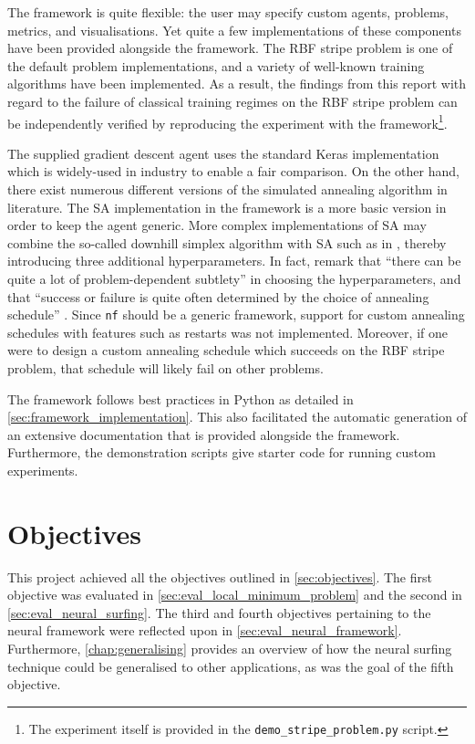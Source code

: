 The framework is quite flexible: the user may specify custom agents, problems, metrics, and visualisations. 
Yet quite a few implementations of these components have been provided alongside the framework.
The RBF stripe problem is one of the default problem implementations, and a variety of well-known training algorithms have been implemented.
As a result, the findings from this report with regard to the failure of classical training regimes on the RBF stripe problem can be independently verified by reproducing the experiment with the framework\footnote{The experiment itself is provided in the \texttt{demo\_stripe\_problem.py} script.}. 

The supplied gradient descent agent uses the standard Keras implementation which is widely-used in industry to enable a fair comparison.
On the other hand, there exist numerous different versions of the simulated annealing algorithm in literature.
The SA implementation in the framework is a more basic version in order to keep the agent generic.
More complex implementations of SA may combine the so-called downhill simplex algorithm \cite{nelder1965} with SA such as in \textcite[p. 444-455]{press1992}, thereby introducing three additional hyperparameters.
In fact, \citeauthor{press1992} remark that ``there can be quite a lot of problem-dependent subtlety'' in choosing the hyperparameters, and that ``success or failure is quite often determined by the choice of annealing schedule'' \cite*[p. 452]{press1992}.
Since \texttt{nf} should be a generic framework, support for custom annealing schedules with features such as restarts was not implemented.
Moreover, if one were to design a custom annealing schedule which succeeds on the RBF stripe problem, that schedule will likely fail on other problems.

The framework follows best practices in Python as detailed in \ref{sec:framework_implementation}.
This also facilitated the automatic generation of an extensive documentation that is provided alongside the framework. 
Furthermore, the demonstration scripts give starter code for running custom experiments.

\section{Objectives}
This project achieved all the objectives outlined in \ref{sec:objectives}. 
The first objective was evaluated in \ref{sec:eval_local_minimum_problem} and the second in \ref{sec:eval_neural_surfing}.
The third and fourth objectives pertaining to the neural framework were reflected upon in \ref{sec:eval_neural_framework}.
Furthermore, \ref{chap:generalising} provides an overview of how the neural surfing technique could be generalised to other applications, as was the goal of the fifth objective.

